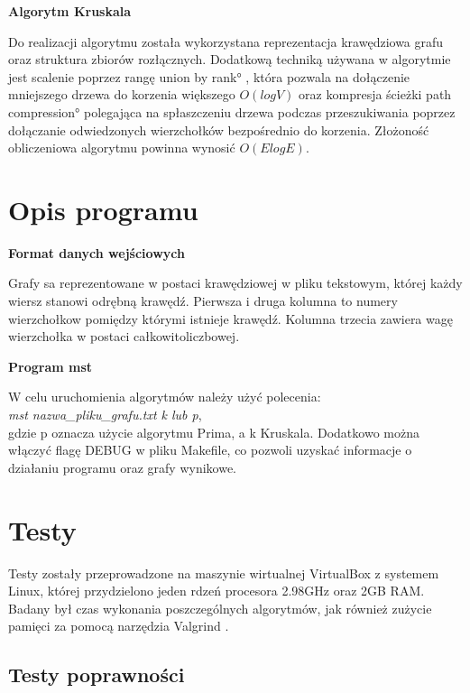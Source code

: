\documentclass[a4paper, 10pt]{article}
\begin{document}
{\bf{Algorytm Kruskala}}

Do realizacji algorytmu została wykorzystana reprezentacja krawędziowa grafu oraz struktura zbiorów rozłącznych. 
Dodatkową techniką używana w algorytmie jest scalenie poprzez rangę \ang{union by rank} \cite{disj}, która pozwala na dołączenie mniejszego drzewa 
do korzenia większego $O(logV)$ oraz kompresja ścieżki \ang{path compression} polegająca na spłaszczeniu drzewa podczas przeszukiwania  poprzez dołączanie 
odwiedzonych wierzchołków bezpośrednio do korzenia. Złożoność obliczeniowa algorytmu powinna wynosić $O(ElogE)$.



\section{Opis programu}

{\bf{Format danych wejściowych}}

Grafy sa reprezentowane w postaci krawędziowej w pliku tekstowym, której
każdy wiersz stanowi odrębną krawędź. Pierwsza i druga kolumna to numery wierzchołkow pomiędzy którymi istnieje krawędź.
Kolumna trzecia zawiera wagę wierzchołka w postaci całkowitoliczbowej.

{\bf{Program mst}}

W celu uruchomienia algorytmów należy użyć polecenia: \\
{\it mst nazwa\_pliku\_grafu.txt k lub p}, \\
gdzie p oznacza użycie algorytmu Prima, a k Kruskala. Dodatkowo można włączyć
flagę DEBUG w pliku Makefile, co pozwoli uzyskać informacje o działaniu
programu oraz grafy wynikowe.




\section{Testy}

Testy zostały przeprowadzone na maszynie wirtualnej VirtualBox z systemem Linux, której przydzielono
jeden rdzeń procesora 2.98GHz oraz 2GB RAM. Badany był czas wykonania poszczególnych algorytmów, jak również
zużycie pamięci za pomocą narzędzia Valgrind \cite{valg}.



\subsection{Testy poprawności}
\end{document}
